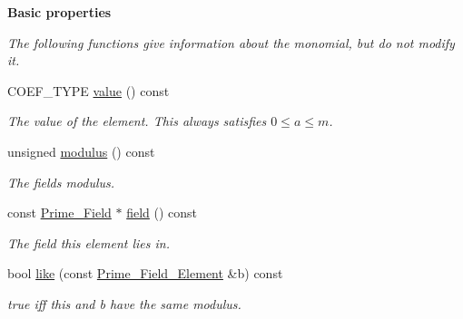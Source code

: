 \begin{Indent}\textbf{ Basic properties}\par
{\em The following functions give information about the monomial, but do not modify it. }\begin{DoxyCompactItemize}
\item 
\mbox{\label{group___fields_group_aa9c68761643afa0b22863904bdfe7e83}} 
C\+O\+E\+F\+\_\+\+T\+Y\+PE \hyperlink{group___fields_group_aa9c68761643afa0b22863904bdfe7e83}{value} () const
\begin{DoxyCompactList}\small\item\em The value of the element. This always satisfies $0\leq a\leq m$. \end{DoxyCompactList}\item 
\mbox{\label{group___fields_group_a4c003344235901132386663a9f28ac1d}} 
unsigned \hyperlink{group___fields_group_a4c003344235901132386663a9f28ac1d}{modulus} () const
\begin{DoxyCompactList}\small\item\em The field\textquotesingle{}s modulus. \end{DoxyCompactList}\item 
\mbox{\label{group___fields_group_a30f455dd34d4e795c63791cdc7ea1f46}} 
const \hyperlink{group___fields_group_class_prime___field}{Prime\+\_\+\+Field} $\ast$ \hyperlink{group___fields_group_a30f455dd34d4e795c63791cdc7ea1f46}{field} () const
\begin{DoxyCompactList}\small\item\em The field this element lies in. \end{DoxyCompactList}\item 
\mbox{\label{group___fields_group_a0d75c69f785c122bf9b3b803c22393dc}} 
bool \hyperlink{group___fields_group_a0d75c69f785c122bf9b3b803c22393dc}{like} (const \hyperlink{group___fields_group_class_prime___field___element}{Prime\+\_\+\+Field\+\_\+\+Element} \&b) const
\begin{DoxyCompactList}\small\item\em {\ttfamily true} iff {\ttfamily this} and {\ttfamily b} have the same modulus. \end{DoxyCompactList}\item 
\mbox{\label{group___fields_group_a7e5881bb8b3f94aa8686e38e7ac78d65}} 

\end{DoxyCompactItemize}
\end{Indent}
